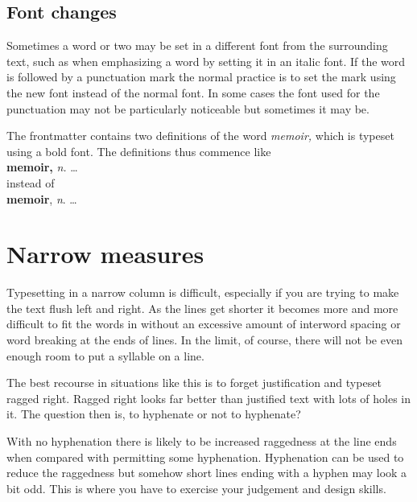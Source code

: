\documentclass[10pt,letterpaper]{memoir}
\begin{document}
\subsection{Font changes}


    Sometimes a word or two may be set in a different font from the 
surrounding text, such as when emphasizing 
a word by setting it in an
italic font. If the word is followed by a punctuation mark the normal
practice is to set the mark using the new font instead of the normal
font. In some cases the font used for the punctuation may not be
particularly noticeable but sometimes it may be. 

    The frontmatter contains two definitions of the word \textit{memoir,}
which is typeset using a bold font. The definitions thus commence like \\
\hspace*{2em} \textbf{memoir,} \textit{n.} \ldots \\
instead of \\
\hspace*{2em} \textbf{memoir}, \textit{n}. \ldots 


\section{Narrow measures}


    Typesetting in a narrow column is difficult, especially if you are
trying to make the text flush left and right. As the lines get shorter
it becomes more and more difficult to fit the words in without an excessive
amount of interword spacing or word breaking at the ends of lines. 
In the limit, of course, there
will not be even enough room to put a syllable on a line.

    The best recourse in situations like this is to forget justification
and typeset ragged right. Ragged right looks far better than justified
text with lots of holes in it.
The question then is, to hyphenate or not to hyphenate?

    With no hyphenation there is likely to be increased raggedness at
the line ends when compared with permitting some hyphenation. Hyphenation
can be used to reduce the raggedness but somehow short lines ending with
a hyphen may look a bit odd. This is where you have to exercise your
judgement and design skills.
\end{document}
